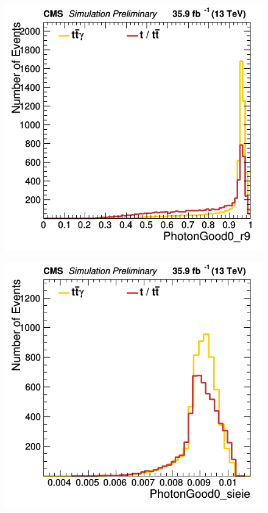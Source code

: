 \documentclass[11pt]{scrartcl}
\begin{document}
	\begin{figure}[H]
	\centering
	\begin{minipage}{.5\textwidth}
	  \centering
	  \includegraphics[width=0.75\linewidth]{figures/Select3/PhotonGood0_r9.png}
	  \label{fig:PhotonGood0r9}
	\end{minipage}%
	\begin{minipage}{.5\textwidth}
	  \centering
	  \includegraphics[width=0.75\linewidth]{figures/Select3/PhotonGood0_sieie.png}
	  \label{fig:PhotonGood0sieie}
	\end{minipage}
	\end{figure}
	
\end{document}
